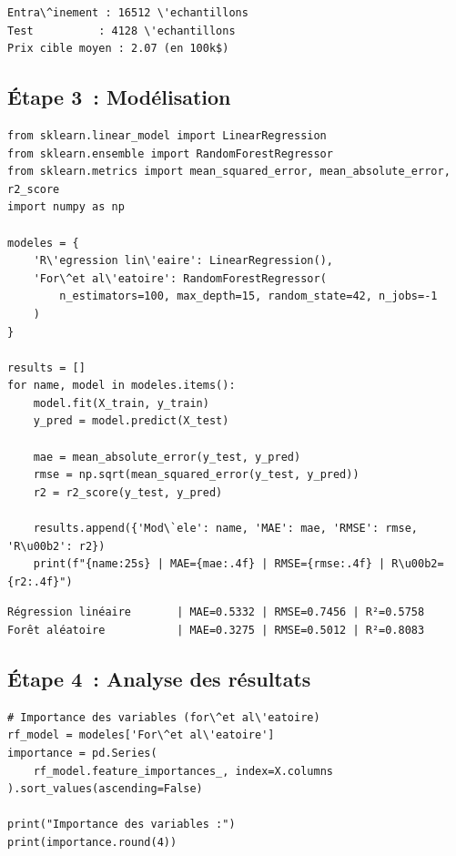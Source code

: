 \begin{codeoutput}
\begin{verbatim}
Entra\^inement : 16512 \'echantillons
Test          : 4128 \'echantillons
Prix cible moyen : 2.07 (en 100k$)
\end{verbatim}
\end{codeoutput}

\subsection{\'Etape 3~: Mod\'elisation}

\begin{codeblock}[title=\textbf{Python}]
\begin{verbatim}
from sklearn.linear_model import LinearRegression
from sklearn.ensemble import RandomForestRegressor
from sklearn.metrics import mean_squared_error, mean_absolute_error, r2_score
import numpy as np

modeles = {
    'R\'egression lin\'eaire': LinearRegression(),
    'For\^et al\'eatoire': RandomForestRegressor(
        n_estimators=100, max_depth=15, random_state=42, n_jobs=-1
    )
}

results = []
for name, model in modeles.items():
    model.fit(X_train, y_train)
    y_pred = model.predict(X_test)

    mae = mean_absolute_error(y_test, y_pred)
    rmse = np.sqrt(mean_squared_error(y_test, y_pred))
    r2 = r2_score(y_test, y_pred)

    results.append({'Mod\`ele': name, 'MAE': mae, 'RMSE': rmse, 'R\u00b2': r2})
    print(f"{name:25s} | MAE={mae:.4f} | RMSE={rmse:.4f} | R\u00b2={r2:.4f}")
\end{verbatim}
\end{codeblock}

\begin{codeoutput}
\begin{verbatim}
Régression linéaire       | MAE=0.5332 | RMSE=0.7456 | R²=0.5758
Forêt aléatoire           | MAE=0.3275 | RMSE=0.5012 | R²=0.8083
\end{verbatim}
\end{codeoutput}

\subsection{\'Etape 4~: Analyse des r\'esultats}

\begin{codeblock}[title=\textbf{Python}]
\begin{verbatim}
# Importance des variables (for\^et al\'eatoire)
rf_model = modeles['For\^et al\'eatoire']
importance = pd.Series(
    rf_model.feature_importances_, index=X.columns
).sort_values(ascending=False)

print("Importance des variables :")
print(importance.round(4))
\end{verbatim}
\end{codeblock}

